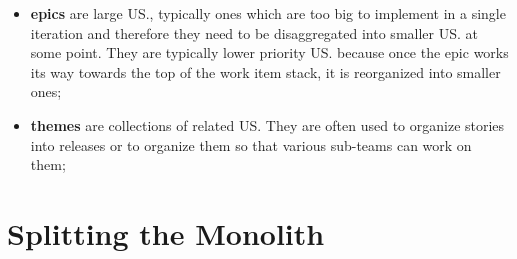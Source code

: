 \documentclass[oneside]{article}
\begin{document}
\begin{itemize}
    \item \textbf{epics} are large US., typically ones which are too big to implement in a single iteration and therefore they need to be disaggregated into smaller US. at some point. They are typically lower priority US. because once the epic works its way towards the top of the work item stack, it is reorganized into smaller ones;
    
    \item \textbf{themes} are collections of related US. They are often used to organize stories into releases or to organize them so that various sub-teams can work on them;
\end{itemize}




\section{Splitting the Monolith}
\end{document}
